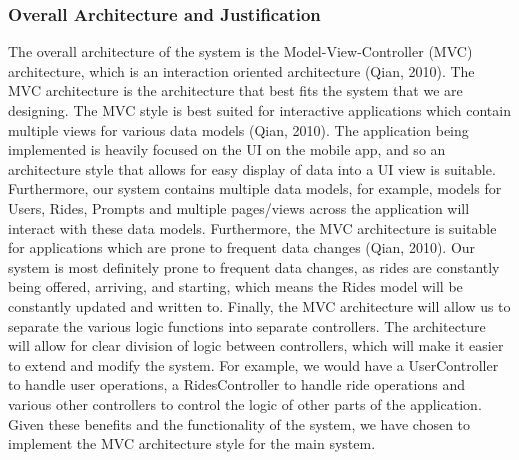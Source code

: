 \documentclass[]{article}
\begin{document}
\subsubsection{Overall Architecture and Justification}
\label{subsub:overall_architecture}
The overall architecture of the system is the Model-View-Controller (MVC) architecture, which is an interaction 
oriented architecture (Qian, 2010). The MVC architecture is the architecture that best fits the system that we are designing. The MVC style is best suited for 
interactive applications which contain multiple views for various data models (Qian, 2010). The application being implemented is heavily focused on the UI 
on the mobile app, and so an architecture style that allows for easy display of data into a UI view is suitable. Furthermore, our system contains multiple data models, for example, models for Users, 
Rides, Prompts and multiple pages/views across the application will interact with these data models. Furthermore, the MVC architecture is suitable for 
applications which are prone to frequent data changes (Qian, 2010). Our system is most definitely prone to frequent data changes, as rides are constantly being offered, 
arriving, and starting, which means the Rides model will be constantly updated and written to. Finally, the MVC architecture will allow us to separate the 
various logic functions into separate controllers. The architecture will allow for clear division of logic between controllers, which will make it easier 
to extend and modify the system. For example, we would have a UserController to handle user operations, a RidesController to handle ride operations and various 
other controllers to control the logic of other parts of the application. Given these benefits and the functionality of the system, we have chosen to implement 
the MVC architecture style for the main system.
\end{document}

